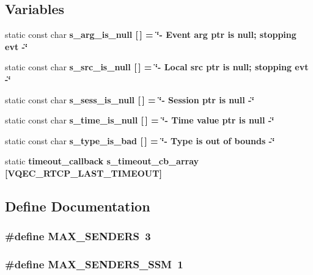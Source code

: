 \subsection*{Variables}
\begin{CompactItemize}
\item 
static const char \bf{s\_\-arg\_\-is\_\-null} [$\,$] = \char`\"{}- Event arg ptr is null; stopping evt -\char`\"{}
\item 
static const char \bf{s\_\-src\_\-is\_\-null} [$\,$] = \char`\"{}- Local src ptr is null; stopping evt -\char`\"{}
\item 
static const char \bf{s\_\-sess\_\-is\_\-null} [$\,$] = \char`\"{}- Session ptr is null -\char`\"{}
\item 
static const char \bf{s\_\-time\_\-is\_\-null} [$\,$] = \char`\"{}- Time value ptr is null -\char`\"{}
\item 
static const char \bf{s\_\-type\_\-is\_\-bad} [$\,$] = \char`\"{}- Type is out of bounds -\char`\"{}
\item 
static \bf{timeout\_\-callback} \bf{s\_\-timeout\_\-cb\_\-array} [VQEC\_\-RTCP\_\-LAST\_\-TIMEOUT]
\end{CompactItemize}


\subsection{Define Documentation}
\subsubsection{\setlength{\rightskip}{0pt plus 5cm}\#define MAX\_\-SENDERS~3}\label{vqec__rtp_8c_c398d12dc2c4f2a3852cee9d33a87dcd}


\subsubsection{\setlength{\rightskip}{0pt plus 5cm}\#define MAX\_\-SENDERS\_\-SSM~1}\label{vqec__rtp_8c_9b6196bbf8f53106c05338123545b11f}


